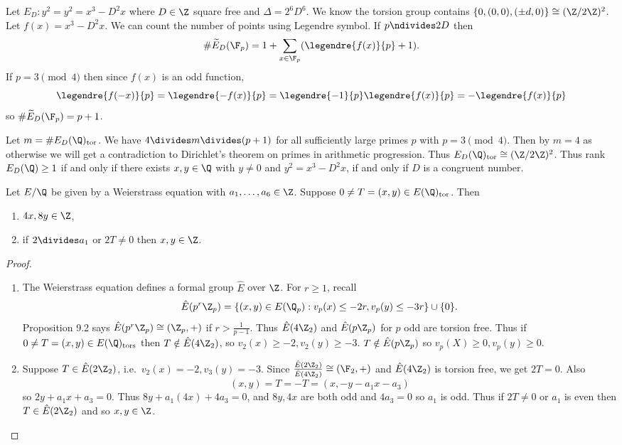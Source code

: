 \documentclass[a4paper]{article}
\theoremstyle{definition}
\theoremstyle{theorem}
\begin{document}
\begin{eg}
  Let \(E_D: y^2 = y^2 = x^3 - D^2 x\) where \(D \in \Z\) square free and \(\Delta = 2^6 D^6\). We know the torsion group contains \(\{0, (0, 0), (\pm d, 0)\} \cong (\Z/2\Z)^2\). Let \(f(x) = x^3 - D^2x\). We can count the number of points using Legendre symbol. If \(p \ndivides 2D\) then
  \[
    \# \widetilde E_D(\F_p) = 1 + \sum_{x \in \F_p} (\legendre{f(x)}{p} + 1).
  \]
  If \(p = 3 \pmod 4\) then since \(f(x)\) is an odd function,
  \[
    \legendre{f(-x)}{p} = \legendre{-f(x)}{p} = \legendre{-1}{p} \legendre{f(x)}{p} = - \legendre{f(x)}{p}
  \]
  so \(\# \widetilde E_D(\F_p) = p + 1\).

  Let \(m = \# E_D(\Q)_{\mathrm{tor}}\). We have \(4 \divides m \divides (p + 1)\) for all sufficiently large primes \(p\) with \(p = 3 \pmod 4\). Then by \(m = 4\) as otherwise we will get a contradiction to Dirichlet's theorem on primes in arithmetic progression. Thus \(E_D(\Q)_{\mathrm{tor}} \cong (\Z/2\Z)^2\). Thus rank \(E_D(\Q) \geq 1\) if and only if there exists \(x, y \in \Q\) with \(y \neq 0\) and \(y^2 = x^3 - D^2x\), if and only if \(D\) is a congruent number.
\end{eg}

\begin{lemma}
  Let \(E/\Q\) be given by a Weierstrass equation with \(a_1, \dots, a_6 \in \Z\). Suppose \(0 \neq T = (x, y) \in E(\Q)_{\mathrm{tor}}\). Then
  \begin{enumerate}
  \item \(4x, 8y \in \Z\),
  \item if \(2 \divides a_1\) or \(2T \neq 0\) then \(x, y \in \Z\).
  \end{enumerate}
\end{lemma}

\begin{proof} \leavevmode
  \begin{enumerate}
  \item The Weierstrass equation defines a formal group \(\hat E\) over \(\Z\). For \(r \geq 1\), recall
    \[
      \hat E(p^r \Z_p) = \{(x, y) \in E(\Q_p): v_p(x) \leq -2r, v_p(y) \leq -3r\} \cup \{0\}.
    \]
    Proposition 9.2 says \(\hat E(p^r\Z_p) \cong (\Z_p, +)\) if \(r > \frac{1}{p - 1}\). Thus \(\hat E(4 \Z_2)\) and \(\hat E(p\Z_p)\) for \(p\) odd are torsion free. Thus if \(0 \neq T = (x, y) \in E(\Q)_{\mathrm{tors}}\) then \(T \notin \hat E(4\Z_2)\), so \(v_2(x) \geq -2, v_2(y) \geq -3\). \(T \notin \hat E(p\Z_p)\) so \(v_p(X) \geq 0, v_p(y) \geq 0\).
  \item Suppose \(T \in \hat E(2 \Z_2)\), i.e.\ \(v_2(x) = -2, v_3(y) = -3\). Since \(\frac{\hat E(2\Z_2)}{\hat E(4\Z_2)} \cong (\F_2, +)\) and \(\hat E(4\Z_2)\) is torsion free, we get \(2T = 0\). Also
    \[
      (x, y) = T = -T = (x, -y - a_1x - a_3)
    \]
    so \(2y + a_1x + a_3 = 0\). Thus \(8y + a_1 (4x) + 4a_3 = 0\), and \(8y, 4x\) are both odd and \(4a_3 = 0\) so \(a_1\) is odd. Thus if \(2T \neq 0\) or \(a_1\) is even then \(T \in \hat E(2\Z_2)\) and so \(x, y \in \Z\).
  \end{enumerate}
\end{proof}
\end{document}
